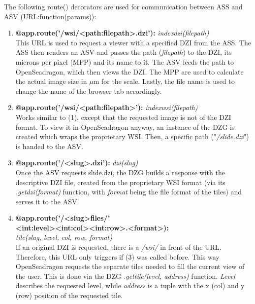 The following route() decorators are used for communication between ASS and ASV (URL:function(params)):

\begin{enumerate}[(1) -]
	\item\textbf{@app.route('/wsi/{\textless}path:file{\textunderscore}path{\textgreater}.dzi'):} \emph{index{\textunderscore}dzi(file{\textunderscore}path)}\\
	This URL is used to request a viewer with a specified DZI from the ASS. The ASS then renders an ASV and passes the path (\emph{file{\textunderscore}path}) to the DZI, its microns per pixel (MPP) and its name to it. The ASV feeds the path to OpenSeadragon, which then views the DZI. The MPP are used to calculate the actual image size in $\mu$m for the scale. Lastly, the file name is used to change the name of the browser tab accordingly.
	
	\item \textbf{@app.route('/wsi/{\textless}path:file{\textunderscore}path{\textgreater}'):} \emph{index{\textunderscore}wsi(file{\textunderscore}path)}\\
	Works similar to (1), except that the requested image is not of the DZI format. To view it in OpenSeadragon anyway, an instance of the DZG is created which wraps the proprietary WSI. Then, a specific path ("\emph{/slide.dzi}") is handed to the ASV.
	
	\item \textbf{@app.route('/{\textless}slug{\textgreater}.dzi'):} \emph{dzi(slug)}\\
	Once the ASV requests slide.dzi, the DZG builds a response with the descriptive DZI file, created from the proprietary WSI format (via its \emph{.get{\textunderscore}dzi(format)} function, with \emph{format} being the file format of the tiles) and serves it to the ASV.
	
	\item \textbf{@app.route('/{\textless}slug{\textgreater}{\textunderscore}files/'\\{\textless}int:level{\textgreater}{\textunderscore}{\textless}int:col{\textgreater}{\textunderscore}{\textless}int:row{\textgreater}.{\textless}format{\textgreater}):}\\ \emph{tile(slug, level, col, row, format)}\\
	If an original DZI is requested, there is a \emph{/wsi/} in front of the URL. Therefore, this URL only triggers if (3) was called before. This way OpenSeadragon requests the separate tiles needed to fill the current view of the user. This is done via the DZG \emph{.get{\textunderscore}tile(level, address)} function. \emph{Level} describes the requested level, while \emph{address} is a tuple with the x (col) and y (row) position of the requested tile.
	

\end{enumerate}
